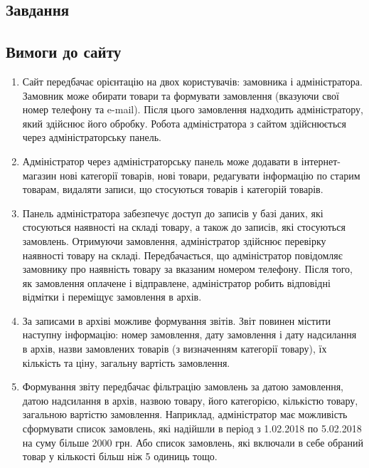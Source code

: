 \begin{titlepage}

\section*{Завдання}
\subsection*{Вимоги до сайту}
\begin{enumerate}
	\item Сайт передбачає орієнтацію на двох користувачів: замовника і адміністратора. 
	Замовник може обирати товари та формувати замовлення (вказуючи свої номер телефону та e-mail). 
	Після цього замовлення надходить адміністратору, який здійснює його обробку. 
	Робота адміністратора з сайтом здійснюється через адміністраторську панель.

	\item Адміністратор через адміністраторську панель може додавати в інтернет-магазин нові категорії товарів, нові товари, редагувати інформацію по старим товарам, видаляти записи, що стосуються товарів і категорій товарів.

	\item Панель адміністратора забезпечує доступ до записів у базі даних, які стосуються наявності на складі товару, а також до записів, які стосуються замовлень. 
	Отримуючи замовлення, адміністратор здійснює перевірку наявності товару на складі. 
	Передбачається, що адміністратор повідомляє замовнику про наявність товару за вказаним номером телефону. 
	Після того, як замовлення оплачене і відправлене, адміністратор робить відповідні відмітки і переміщує замовлення в архів. 

	\item За записами в архіві можливе формування звітів.
	Звіт повинен містити наступну інформацію:
	номер замовлення,
	дату замовлення і дату надсилання в архів,
	назви замовлених товарів (з визначенням категорії товару), їх кількість та ціну,
	загальну вартість замовлення.

	\item Формування звіту передбачає фільтрацію замовлень за датою замовлення, датою надсилання в архів, назвою товару, його категорією, кількістю товару, загальною вартістю замовлення. 
	Наприклад, адміністратор має можливість сформувати список замовлень, які надійшли в період з 1.02.2018 по 5.02.2018 на суму більше 2000 грн. 
	Або список замовлень, які включали в себе обраний товар у кількості більш ніж 5 одиниць тощо.
\end{enumerate}

\end{titlepage}
